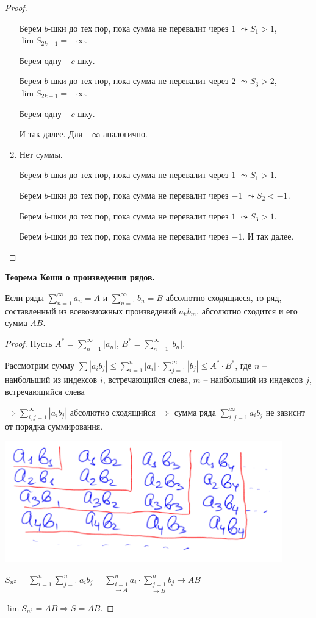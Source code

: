 \begin{proof}
\begin{enumerate}
        Берем $b$-шки до тех пор, пока сумма не перевалит через $1$ $\leadsto S_1>1$, $\lim S_{2k-1}=+\infty$.

        Берем одну $-c$-шку.
        
        Берем $b$-шки до тех пор, пока сумма не перевалит через $2$ $\leadsto S_3>2$, $\lim S_{2k-1}=+\infty$.

        Берем одну $-c$-шку.

        И так далее. Для $-\infty$ аналогично.

        \item Нет суммы.

        Берем $b$-шки до тех пор, пока сумма не перевалит через $1$ $\leadsto S_1>1$.
        
        Берем $b$-шки до тех пор, пока сумма не перевалит через $-1$ $\leadsto S_2<-1$.

        Берем $b$-шки до тех пор, пока сумма не перевалит через $1$ $\leadsto S_3>1$.

        Берем $b$-шки до тех пор, пока сумма не перевалит через $-1$. И так далее.
    \end{enumerate}
\end{proof}

\begin{theorem}
    \textbf{Теорема Коши о произведении рядов.}

    Если ряды $\sum\limits_{n=1}^\infty a_n=A$ и $\sum\limits_{n=1}^\infty b_n=B$ абсолютно сходящиеся, то ряд, составленный из всевозможных произведений $a_kb_m$, абсолютно сходится и его сумма $AB$.
\end{theorem}

\begin{proof}
    Пусть $A^*=\sum\limits_{n=1}^\infty |a_n|$, $B^*=\sum\limits_{n=1}^\infty |b_n|$.

    Рассмотрим сумму $\sum |a_i b_j|\leq \sum\limits_{i=1}^n|a_i|\cdot \sum\limits_{j=1}^m|b_j|\leq A^*\cdot B^*$, где $n$ – наибольший из индексов $i$, встречающийся слева, $m$ – наибольший из индексов $j$, встречающийся слева

    $\Rightarrow \sum\limits_{i, j=1}^\infty |a_i b_j|$ абсолютно сходящийся $\Rightarrow$ сумма ряда $\sum\limits_{i, j=1}^\infty a_i b_j$ не зависит от порядка суммирования.

    \includegraphics[width=0.4\linewidth]{images/12-04-2.png}
    
    $S_{n^2}=\sum\limits_{i=1}^n\sum\limits_{j=1}^n a_ib_j=\underset{\rightarrow A}{\sum\limits_{i=1}^na_i}\cdot \underset{\rightarrow B}{\sum\limits_{j=1}^n b_j}\rightarrow AB$

    $\lim S_{n^2}=AB\Rightarrow S= AB$.
\end{proof}

